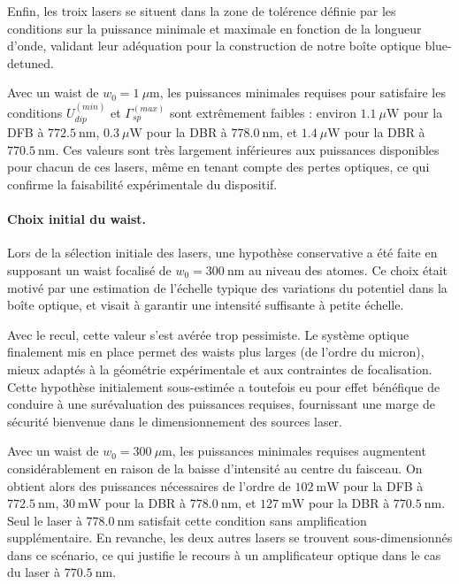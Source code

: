 Enfin, les troix lasers  se situent dans la zone de tolérence définie par les conditions sur la puissance minimale et maximale en fonction de la longueur d’onde, validant leur adéquation pour la construction de notre boîte optique blue-detuned.

\medskip

Avec un waist de $w_0 = 1~\mu\text{m}$, les puissances minimales requises pour satisfaire les conditions $U_{dip}^{(min)}$ et $\Gamma_{sp}^{(max)}$ sont extrêmement faibles : environ $1.1~\mu\text{W}$ pour la DFB à $772.5~\text{nm}$, $0.3~\mu\text{W}$ pour la DBR à $778.0~\text{nm}$, et $1.4~\mu\text{W}$ pour la DBR à $770.5~\text{nm}$. Ces valeurs sont très largement inférieures aux puissances disponibles pour chacun de ces lasers, même en tenant compte des pertes optiques, ce qui confirme la faisabilité expérimentale du dispositif.

\paragraph{Choix initial du waist.}

Lors de la sélection initiale des lasers, une hypothèse conservative a été faite en supposant un waist focalisé de $w_0 = 300~\text{nm}$ au niveau des atomes. Ce choix était motivé par une estimation de l’échelle typique des variations du potentiel dans la boîte optique, et visait à garantir une intensité suffisante à petite échelle.

\medskip

Avec le recul, cette valeur s’est avérée trop pessimiste. Le système optique finalement mis en place permet des waists plus larges (de l’ordre du micron), mieux adaptés à la géométrie expérimentale et aux contraintes de focalisation. Cette hypothèse initialement sous-estimée a toutefois eu pour effet bénéfique de conduire à une surévaluation des puissances requises, fournissant une marge de sécurité bienvenue dans le dimensionnement des sources laser.

\medskip

Avec un waist de $w_0 = 300~\mu\text{m}$, les puissances minimales requises augmentent considérablement en raison de la baisse d’intensité au centre du faisceau. On obtient alors des puissances nécessaires de l’ordre de $102~\text{mW}$ pour la DFB à $772.5~\text{nm}$, $30~\text{mW}$ pour la DBR à $778.0~\text{nm}$, et $127~\text{mW}$ pour la DBR à $770.5~\text{nm}$. Seul le laser à $778.0~\text{nm}$ satisfait cette condition sans amplification supplémentaire. En revanche, les deux autres lasers se trouvent sous-dimensionnés dans ce scénario, ce qui justifie le recours à un amplificateur optique dans le cas du laser à $770.5~\text{nm}$.


